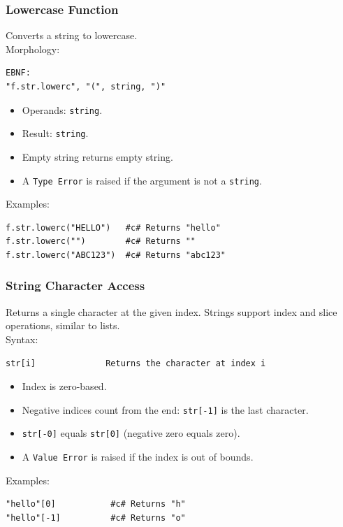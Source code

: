 \subsubsection{Lowercase Function}
Converts a string to lowercase. \\
Morphology:
\begin{verbatim}
EBNF:
"f.str.lowerc", "(", string, ")"
\end{verbatim}
\begin{itemize}
\item Operands: \texttt{string}.
\item Result: \texttt{string}.
\item Empty string returns empty string.
\item A \texttt{Type Error} is raised if the argument is not a \texttt{string}.
\end{itemize}
Examples:
\begin{verbatim}
f.str.lowerc("HELLO")   #c# Returns "hello"
f.str.lowerc("")        #c# Returns ""
f.str.lowerc("ABC123")  #c# Returns "abc123"
\end{verbatim}

\subsubsection{String Character Access}
Returns a single character at the given index. Strings support index and slice operations, similar to lists. \\
Syntax:
\begin{verbatim}
str[i]              Returns the character at index i
\end{verbatim}
\begin{itemize}
\item Index is zero-based.
\item Negative indices count from the end: \texttt{str[-1]} is the last character.
\item \texttt{str[-0]} equals \texttt{str[0]} (negative zero equals zero).
\item A \texttt{Value Error} is raised if the index is out of bounds.
\end{itemize}
Examples:
\begin{verbatim}
"hello"[0]           #c# Returns "h"
"hello"[-1]          #c# Returns "o"
\end{verbatim}

